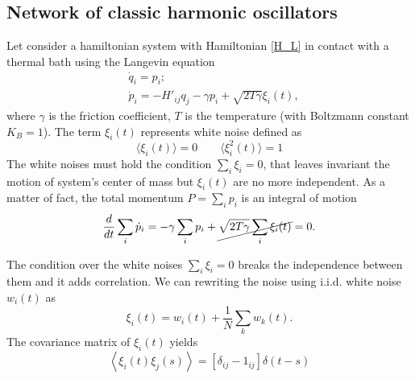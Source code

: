 \subsection{Network of classic harmonic oscillators}

Let consider a hamiltonian system with Hamiltonian \eqref{H_L} in contact with a thermal bath using the Langevin equation
\begin{equation}
    \begin{aligned}
        &\dot q_i = p_i; \\
        &\dot p_i  = -H'_{ij}q_j - \gamma p_i + \sqrt{2T\gamma}\xi_i(t),
    \end{aligned}
\end{equation}
where $\gamma$ is the friction coefficient, $T$ is the temperature (with Boltzmann constant $K_B =1$). The term $\xi_i(t)$ represents white noise defined as
\begin{equation}\label{white_noise}
    \langle\xi_i(t)\rangle = 0 \qquad \langle\xi_i^2(t)\rangle = 1 
\end{equation}
The white noises must hold the condition $\sum_i \xi_i = 0$, that leaves invariant the motion of  system's center of mass but $\xi_i(t)$ are no more independent.
As a matter of fact, the total momentum $P = \sum_i p_i$ is an integral of motion
\begin{equation}
    \frac{d}{dt} \sum_i \dot p_i = - \gamma \sum_{i}p_i + \cancel{\sqrt{2T\gamma}\sum_i\xi_i(t)} = 0.
\end{equation}

The condition over the white noises $\sum_i \xi_i = 0$ breaks the independence between them and it adds correlation.
We can rewriting the noise using i.i.d. white noise $w_i(t)$ as
\begin{equation}
    \xi_i(t) = w_i (t) + \frac{1}{N} \sum_k w_k(t).
\end{equation}
The covariance matrix of $\xi_i(t)$ yields
\begin{equation}
    \left<\xi_i(t)\xi_j(s)\right> = \left[\delta_{ij} - 1_{ij}\right]\delta(t-s)
\end{equation}

